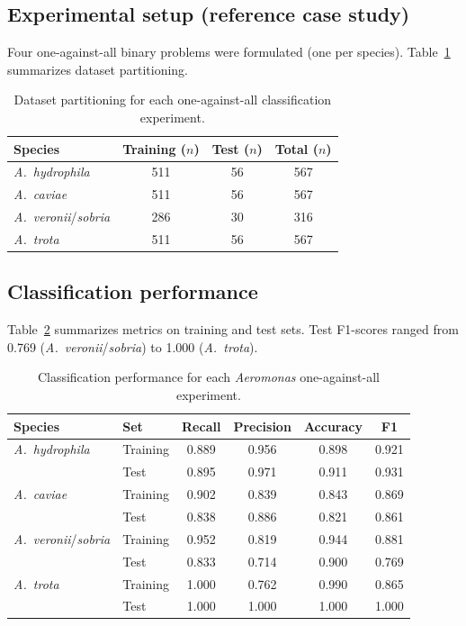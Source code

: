 \documentclass[preprint,12pt]{elsarticle}
\begin{document}
\subsection{Experimental setup (reference case study)}
Four one-against-all binary problems were formulated (one per species). Table~\ref{tab:partition} summarizes dataset partitioning.

\begin{table}[H]
  \centering
  \caption{Dataset partitioning for each one-against-all classification experiment.}
  \label{tab:partition}
  \begin{tabular}{@{}lccc@{}}
    \toprule
    Species & Training ($n$) & Test ($n$) & Total ($n$) \\
    \midrule
    \textit{A.~hydrophila} & 511 & 56 & 567 \\
    \textit{A.~caviae} & 511 & 56 & 567 \\
    \textit{A.~veronii}/\textit{sobria} & 286 & 30 & 316 \\
    \textit{A.~trota} & 511 & 56 & 567 \\
    \bottomrule
  \end{tabular}
\end{table}

\subsection{Classification performance}
Table~\ref{tab:performance} summarizes metrics on training and test sets. Test F1-scores ranged from 0.769 (\textit{A.~veronii}/\textit{sobria}) to 1.000 (\textit{A.~trota}).

\begin{table}[H]
  \centering
  \caption{Classification performance for each \textit{Aeromonas} one-against-all experiment.}
  \label{tab:performance}
  \small
  \begin{tabular}{@{}llcccc@{}}
    \toprule
    Species & Set & Recall & Precision & Accuracy & F1 \\
    \midrule
    \textit{A.~hydrophila} & Training & 0.889 & 0.956 & 0.898 & 0.921 \\
    & Test & 0.895 & 0.971 & 0.911 & 0.931 \\
    \textit{A.~caviae} & Training & 0.902 & 0.839 & 0.843 & 0.869 \\
    & Test & 0.838 & 0.886 & 0.821 & 0.861 \\
    \textit{A.~veronii}/\textit{sobria} & Training & 0.952 & 0.819 & 0.944 & 0.881 \\
    & Test & 0.833 & 0.714 & 0.900 & 0.769 \\
    \textit{A.~trota} & Training & 1.000 & 0.762 & 0.990 & 0.865 \\
    & Test & 1.000 & 1.000 & 1.000 & 1.000 \\
    \bottomrule
  \end{tabular}
\end{table}
\end{document}
